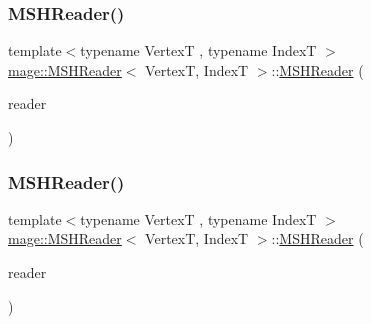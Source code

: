 \hypertarget{classmage_1_1_m_s_h_reader_aa33b8f059752b9aa321e8d227fe811bd}{}\label{classmage_1_1_m_s_h_reader_aa33b8f059752b9aa321e8d227fe811bd} 
\subsubsection{\texorpdfstring{M\+S\+H\+Reader()}{MSHReader()}\hspace{0.1cm}{\footnotesize\ttfamily [2/3]}}
{\footnotesize\ttfamily template$<$typename VertexT , typename IndexT $>$ \\
\hyperlink{classmage_1_1_m_s_h_reader}{mage\+::\+M\+S\+H\+Reader}$<$ VertexT, IndexT $>$\+::\hyperlink{classmage_1_1_m_s_h_reader}{M\+S\+H\+Reader} (\begin{DoxyParamCaption}\item[{const \hyperlink{classmage_1_1_m_s_h_reader}{M\+S\+H\+Reader}$<$ VertexT, IndexT $>$ \&}]{reader }\end{DoxyParamCaption})\hspace{0.3cm}{\ttfamily [delete]}}

\hypertarget{classmage_1_1_m_s_h_reader_a78e8751423b659aea0b2d91d281fa5fa}{}\label{classmage_1_1_m_s_h_reader_a78e8751423b659aea0b2d91d281fa5fa} 
\subsubsection{\texorpdfstring{M\+S\+H\+Reader()}{MSHReader()}\hspace{0.1cm}{\footnotesize\ttfamily [3/3]}}
{\footnotesize\ttfamily template$<$typename VertexT , typename IndexT $>$ \\
\hyperlink{classmage_1_1_m_s_h_reader}{mage\+::\+M\+S\+H\+Reader}$<$ VertexT, IndexT $>$\+::\hyperlink{classmage_1_1_m_s_h_reader}{M\+S\+H\+Reader} (\begin{DoxyParamCaption}\item[{\hyperlink{classmage_1_1_m_s_h_reader}{M\+S\+H\+Reader}$<$ VertexT, IndexT $>$ \&\&}]{reader }\end{DoxyParamCaption})\hspace{0.3cm}{\ttfamily [delete]}}

\hypertarget{classmage_1_1_m_s_h_reader_aca7a192cd593d38167b5c284a0555932}{}\label{classmage_1_1_m_s_h_reader_aca7a192cd593d38167b5c284a0555932} 
